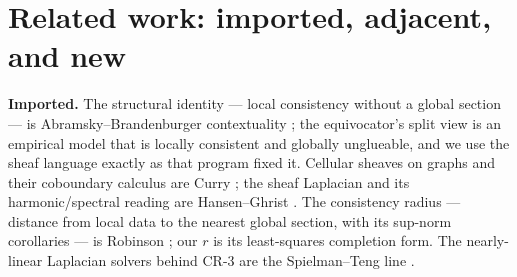 \documentclass[11pt,a4paper]{article}
\begin{document}
\section{Related work: imported, adjacent, and new}\label{sec:related}

\textbf{Imported.} The structural identity --- local consistency without a global section --- is Abramsky--Brandenburger
contextuality \cite{abramsky-brandenburger}; the equivocator's split view is an empirical model that is locally consistent
and globally unglueable, and we use the sheaf language exactly as that program fixed it. Cellular sheaves on graphs and
their coboundary calculus are Curry \cite{curry}; the sheaf Laplacian and its harmonic/spectral reading are
Hansen--Ghrist \cite{hansen-ghrist}. The consistency radius --- distance from local data to the nearest global section,
with its sup-norm corollaries --- is Robinson \cite{robinson}; our $r$ is its least-squares completion form. The
nearly-linear Laplacian solvers behind CR-3 are the Spielman--Teng line \cite{spielman-teng}.
\end{document}
